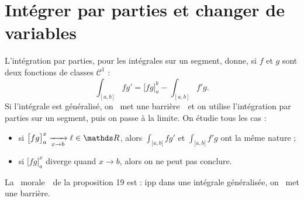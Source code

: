 \section{Intégrer par parties et changer de variables}

\begin{prop}
	L'intégration par parties, pour les intégrales sur un segment, donne, si $f$\/ et $g$\/ sont deux fonctions de classes $\mathscr{C}^1$\/ : \[
		\int_{[a,b]} fg' = \Big[fg\Big]_a^b-\int_{[a,b]} f'g
	.\]
	Si l'intégrale est généralisé, on \guillemotleft~met une barrière~\guillemotright\ et on utilise l'intégration par parties sur un segment, puis on passe à la limite. On étudie tous les cas :
	\begin{itemize}
		\item si $\big[fg\big]_a^x \tendsto{x\to b} \ell \in \R$, alors $\int_{[a,b[} fg'$\/ et $\int_{[a,b[} f'g$\/ ont la même nature ;
		\item si $\big[fg\big]_a^x$\/ diverge quand $x \to b$, alors on ne peut pas conclure.
	\end{itemize}
	La \guillemotleft~morale~\guillemotright\ de la proposition 19 est : {\sc ipp}\/ dans une intégrale généralisée, on \guillemotleft~met une barrière.~\guillemotright
\end{prop}

